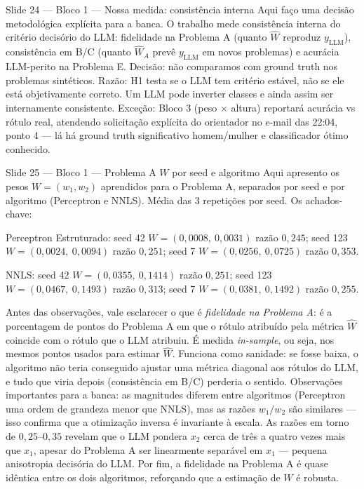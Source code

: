 \documentclass[aspectratio=169,10pt]{beamer}
\begin{document}
\begin{frame}{Slide 24 --- Bloco 1 --- Nossa medida: consist\^encia interna}
\footnotesize
Aqui fa\c{c}o uma decis\~ao metodol\'ogica expl\'icita para a banca. O trabalho mede consist\^encia interna do crit\'erio decis\'orio do LLM: fidelidade na Problema A (quanto $\hat W$ reproduz $y_{\text{LLM}}$), consist\^encia em B/C (quanto $\hat W_A$ prev\^e $y_{\text{LLM}}$ em novos problemas) e acur\'acia LLM-perito na Problema E. Decis\~ao: n\~ao comparamos com ground truth nos problemas sint\'eticos. Raz\~ao: H1 testa se o LLM tem crit\'erio est\'avel, n\~ao se ele est\'a objetivamente correto. Um LLM pode inverter classes e ainda assim ser internamente consistente. Exce\c{c}\~ao: Bloco 3 (peso $\times$ altura) reportar\'a acur\'acia vs r\'otulo real, atendendo solicita\c{c}\~ao expl\'icita do orientador no e-mail das 22:04, ponto 4 --- l\'a h\'a ground truth significativo homem/mulher e classificador \'otimo conhecido.
\end{frame}

\begin{frame}{Slide 25 --- Bloco 1 --- Problema A $W$ por seed e algoritmo}
\footnotesize
Aqui apresento os pesos $W = (w_1, w_2)$ aprendidos para o Problema A, separados por seed e por algoritmo (Perceptron e NNLS). M\'edia das 3 repeti\c{c}\~oes por seed. Os achados-chave:

Perceptron Estruturado: seed 42 $W=(0{,}0008,\ 0{,}0031)$ raz\~ao $0{,}245$; seed 123 $W=(0{,}0024,\ 0{,}0094)$ raz\~ao $0{,}251$; seed 7 $W=(0{,}0256,\ 0{,}0725)$ raz\~ao $0{,}353$.

NNLS: seed 42 $W=(0{,}0355,\ 0{,}1414)$ raz\~ao $0{,}251$; seed 123 $W=(0{,}0467,\ 0{,}1493)$ raz\~ao $0{,}313$; seed 7 $W=(0{,}0381,\ 0{,}1492)$ raz\~ao $0{,}255$.

Antes das observa\c{c}\~oes, vale esclarecer o que \'e \emph{fidelidade na Problema A}: \'e a porcentagem de pontos do Problema A em que o r\'otulo atribu\'ido pela m\'etrica $\hat W$ coincide com o r\'otulo que o LLM atribuiu. \'E medida \emph{in-sample}, ou seja, nos mesmos pontos usados para estimar $\hat W$. Funciona como sanidade: se fosse baixa, o algoritmo n\~ao teria conseguido ajustar uma m\'etrica diagonal aos r\'otulos do LLM, e tudo que viria depois (consist\^encia em B/C) perderia o sentido. Observa\c{c}\~oes importantes para a banca: as magnitudes diferem entre algoritmos (Perceptron uma ordem de grandeza menor que NNLS), mas as raz\~oes $w_1/w_2$ s\~ao similares --- isso confirma que a otimiza\c{c}\~ao inversa \'e invariante \`a escala. As raz\~oes em torno de $0{,}25$--$0{,}35$ revelam que o LLM pondera $x_2$ cerca de tr\^es a quatro vezes mais que $x_1$, apesar do Problema A ser linearmente separ\'avel em $x_1$ --- pequena anisotropia decis\'oria do LLM. Por fim, a fidelidade na Problema A \'e quase id\^entica entre os dois algoritmos, refor\c{c}ando que a estima\c{c}\~ao de $W$ \'e robusta.
\end{frame}
\end{document}
